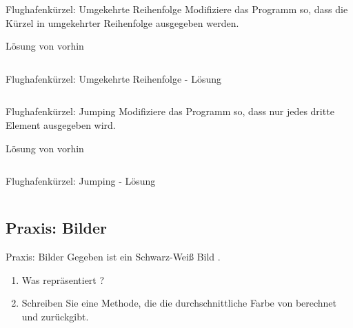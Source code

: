 \documentclass[usepdftitle=false,hyperref={pdfpagelabels=false}]{beamer}
\begin{document}
\begin{frame}{Flughafenkürzel: Umgekehrte Reihenfolge}
    Modifiziere das Programm so, dass die Kürzel in umgekehrter 
    Reihenfolge ausgegeben werden.
    \begin{block}{Lösung von vorhin}
    \inputminted[linenos=true, numbersep=5pt, tabsize=4, fontsize=\tiny]{java}{IataCode.java}
    \end{block}
\end{frame}

\begin{frame}{Flughafenkürzel: Umgekehrte Reihenfolge - Lösung}
    \inputminted[linenos=true, numbersep=5pt, tabsize=4, fontsize=\small]{java}{IataCode-2.java}
\end{frame}

\begin{frame}{Flughafenkürzel: Jumping}
    Modifiziere das Programm so, dass nur jedes dritte Element 
    ausgegeben wird.
    \begin{block}{Lösung von vorhin}
    \inputminted[linenos=true, numbersep=5pt, tabsize=4, fontsize=\tiny]{java}{IataCode.java}
    \end{block}
\end{frame}

\begin{frame}{Flughafenkürzel: Jumping - Lösung}
    \inputminted[linenos=true, numbersep=5pt, tabsize=4, fontsize=\small]{java}{IataCode-3.java}
\end{frame}

\subsection{Praxis: Bilder}
\begin{frame}{Praxis: Bilder}
    Gegeben ist ein Schwarz-Weiß Bild .
    \begin{enumerate}
        \item Was repräsentiert ?
        \item Schreiben Sie eine Methode, die die durchschnittliche
              Farbe von  berechnet und zurückgibt.
    \end{enumerate}
\end{frame}
\end{document}
